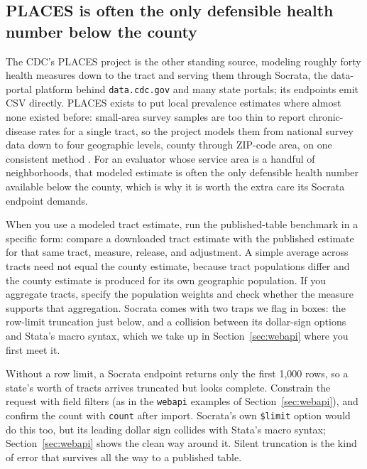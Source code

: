\subsection{PLACES is often the only defensible health number below the county}\label{ch03-places}
The CDC's PLACES project is the other standing source, modeling roughly forty health measures down to the tract and serving them through Socrata, the data-portal platform behind \texttt{data.cdc.gov} and many state portals; its endpoints emit CSV directly. PLACES exists to put local prevalence estimates where almost none existed before: small-area survey samples are too thin to report chronic-disease rates for a single tract, so the project models them from national survey data down to four geographic levels, county through ZIP-code area, on one consistent method \parencite{greenlund2022places}. For an evaluator whose service area is a handful of neighborhoods, that modeled estimate is often the only defensible health number available below the county, which is why it is worth the extra care its Socrata endpoint demands.

When you use a modeled tract estimate, run the published-table benchmark in a specific form: compare a downloaded tract estimate with the published estimate for that same tract, measure, release, and adjustment. A simple average across tracts need not equal the county estimate, because tract populations differ and the county estimate is produced for its own geographic population. If you aggregate tracts, specify the population weights and check whether the measure supports that aggregation. Socrata comes with two traps we flag in boxes: the row-limit truncation just below, and a collision between its dollar-sign options and Stata's macro syntax, which we take up in Section~\ref{sec:webapi} where you first meet it.

\begin{vizcallout}
Without a row limit, a Socrata endpoint returns only the first 1{,}000 rows, so a state's worth of tracts arrives truncated but looks complete. Constrain the request with field filters (as in the \texttt{webapi} examples of Section~\ref{sec:webapi}), and confirm the count with \texttt{count} after import. Socrata's own \texttt{\$limit} option would do this too, but its leading dollar sign collides with Stata's macro syntax; Section~\ref{sec:webapi} shows the clean way around it. Silent truncation is the kind of error that survives all the way to a published table.
\end{vizcallout}

